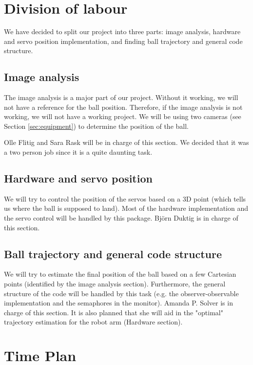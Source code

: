\documentclass{article}
\begin{document}
\section{Division of labour} \label{sec:division}
We have decided to split our project into three parts: image analysis, hardware and servo position implementation, and finding ball trajectory and general code structure.
	\subsection{Image analysis}
        The image analysis is a major part of our project. Without it working, we will not have a reference for the ball position. Therefore, if the image analysis is not working, we will not have a working project. We will be using two cameras (see Section \ref{sec:equipment}) to determine the position of the ball. 
    
        Olle Flitig and Sara Rask will be in charge of this section. We decided that it was a two person job since it is a quite daunting task.
    
    \subsection{Hardware and servo position}
        We will try to control the position of the servos based on a 3D point (which tells us  where the ball is supposed to land). Most of the hardware implementation and the servo control will be handled by this package. Björn Duktig is in charge of this section.
    
    \subsection{Ball trajectory and general code structure}
        We will try to estimate the final position of the ball based on a few Cartesian points (identified by the image analysis section). Furthermore, the general structure of the code will be handled by this task (e.g. the observer-observable implementation and the semaphores in the monitor). Amanda P. Solver is in charge of this section. It is also planned that she will aid in the "optimal" trajectory estimation for the robot arm (Hardware section).

\section{Time Plan}
\end{document}
